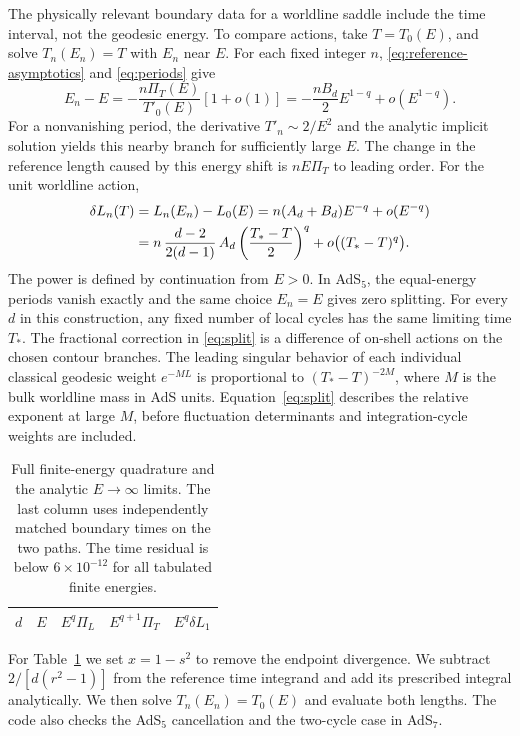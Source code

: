 \documentclass[11pt,a4paper]{article}
\begin{document}
The physically relevant boundary data for a worldline saddle include the time interval, not the geodesic energy. To compare actions, take \(T=T_0(E)\), and solve \(T_n(E_n)=T\) with \(E_n\) near \(E\). For each fixed integer \(n\), \eqref{eq:reference-asymptotics} and \eqref{eq:periods} give
\begin{equation}
 E_n-E=-\frac{n\Pi_T(E)}{T'_0(E)}[1+o(1)]
       =-\frac{n B_d}{2} E^{1-q}+o(E^{1-q}).
 \label{eq:energy-shift}
\end{equation}
For a nonvanishing period, the derivative \(T'_n\sim2/E^2\) and the analytic implicit solution yields this nearby branch for sufficiently large \(E\). The change in the reference length caused by this energy shift is \(nE\Pi_T\) to leading order. For the unit worldline action,
\begin{align}
 \delta L_n(T)&=L_n(E_n)-L_0(E)
    =n(A_d+B_d)E^{-q}+o(E^{-q}) \notag\\
   &=n\,\frac{d-2}{2(d-1)}\,A_d
      \left(\frac{T_*-T}{2}\right)^q
       +o\big((T_*-T)^q\big).
 \label{eq:split}
\end{align}
The power is defined by continuation from \(E>0\). In AdS\(_5\), the equal-energy periods vanish exactly and the same choice \(E_n=E\) gives zero splitting. For every \(d\) in this construction, any fixed number of local cycles has the same limiting time \(T_*\). The fractional correction in \eqref{eq:split} is a difference of on-shell actions on the chosen contour branches. The leading singular behavior of each individual classical geodesic weight \(e^{-M L}\) is proportional to \((T_*-T)^{-2M}\), where \(M\) is the bulk worldline mass in AdS units. Equation~\eqref{eq:split} describes the relative exponent at large \(M\), before fluctuation determinants and integration-cycle weights are included.

\begin{table}[t]
 \centering
 \small
 \begin{tabular}{ccccc}
 \hline
 \(d\) & \(E\) & \(E^{q}\Pi_L\) & \(E^{q+1}\Pi_T\) & \(E^q\delta L_1\)\\
 \hline
 
 \end{tabular}
 \caption{Full finite-energy quadrature and the analytic \(E\to\infty\) limits.
 The last column uses independently matched boundary times on the two paths.
 The time residual is below \(6\times10^{-12}\) for all tabulated finite energies.}
 \label{tab:periods}
\end{table}

For Table~\ref{tab:periods} we set \(x=1-s^2\) to remove the endpoint divergence. We subtract \(2/[d(r^2-1)]\) from the reference time integrand and add its prescribed integral analytically. We then solve \(T_n(E_n)=T_0(E)\) and evaluate both lengths. The code also checks the AdS\(_5\) cancellation and the two-cycle case in AdS\(_7\).
\end{document}
